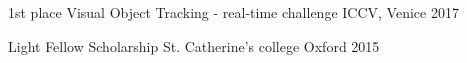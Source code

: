 \begin{cvhonors}

  \cvhonor
    {1st place} %
    {Visual Object Tracking - real-time challenge} %
    {ICCV, Venice} %
    {2017} %

  \cvhonor
    {Light Fellow Scholarship} %
    {St. Catherine's college} %
    {Oxford} %
    {2015} %
\end{cvhonors}